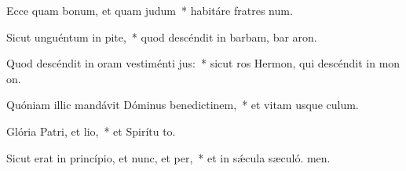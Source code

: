 \item Ecce quam bonum, et quam judum~* habitáre fratres  num.
\item Sicut unguéntum in pite,~* quod descéndit in barbam, bar aron.
\item Quod descéndit in oram vestiménti jus:~* sicut ros Hermon, qui descéndit in mon on.
\item Quóniam illic mandávit Dóminus benedictinem,~* et vitam usque  culum.
\item Glória Patri, et lio,~* et Spirítu to.
\item Sicut erat in princípio, et nunc, et per,~* et in sǽcula sæculó. men.
